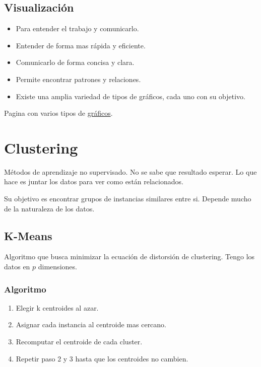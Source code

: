 \documentclass[titlepage,a4paper]{article}
\begin{document}
\subsection{Visualización}
\begin{itemize}
    \item Para entender el trabajo y comunicarlo.
    \item Entender de forma mas rápida y eficiente.
    \item Comunicarlo de forma concisa y clara.
    \item Permite encontrar patrones y relaciones.
    \item Existe una amplia variedad de tipos de gráficos, cada uno con su objetivo.
\end{itemize}

Pagina con varios tipos de \href{https://www.python-graph-gallery.com/}{gráficos}.

\newpage

\section{Clustering}

Métodos de aprendizaje no supervisado. No se sabe que resultado esperar. Lo que hace es juntar los datos para ver como están relacionados.

Su objetivo es encontrar grupos de instancias similares entre si. Depende mucho de la naturaleza de los datos.


\subsection{K-Means}
Algoritmo que busca minimizar la ecuación de distorsión de clustering. Tengo los datos en $p$ dimensiones.

\subsubsection*{Algoritmo}
\begin{enumerate}
    \item Elegir k centroides al azar.
    \item Asignar cada instancia al centroide mas cercano.
    \item Recomputar el centroide de cada cluster.
    \item Repetir paso 2 y 3 hasta que los centroides no cambien.
\end{enumerate}
\end{document}
